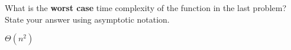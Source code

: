 
\begin{prob}
    What is the \textbf{worst case} time complexity of the function in the last problem?
    State your answer using asymptotic notation.

    \begin{soln}
        $\Theta(n^2)$
    \end{soln}

\end{prob}
